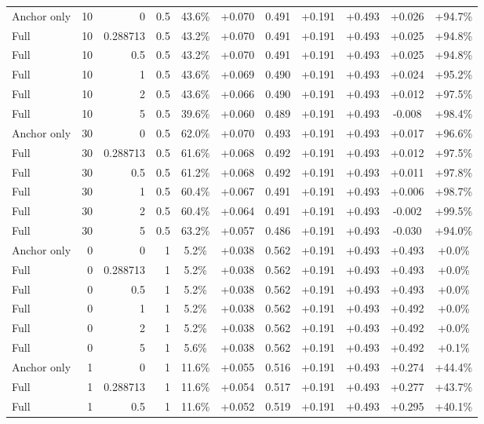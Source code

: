 \begin{table}[htbp]
\begin{tabular}{lrrrccccccc}
Anchor only & 10 & 0 & 0.5 & 43.6\% & +0.070 & 0.491 & +0.191 & +0.493 & +0.026 & +94.7\% \\
Full & 10 & 0.288713 & 0.5 & 43.2\% & +0.070 & 0.491 & +0.191 & +0.493 & +0.025 & +94.8\% \\
Full & 10 & 0.5 & 0.5 & 43.2\% & +0.070 & 0.491 & +0.191 & +0.493 & +0.025 & +94.8\% \\
Full & 10 & 1 & 0.5 & 43.6\% & +0.069 & 0.490 & +0.191 & +0.493 & +0.024 & +95.2\% \\
Full & 10 & 2 & 0.5 & 43.6\% & +0.066 & 0.490 & +0.191 & +0.493 & +0.012 & +97.5\% \\
Full & 10 & 5 & 0.5 & 39.6\% & +0.060 & 0.489 & +0.191 & +0.493 & -0.008 & +98.4\% \\
Anchor only & 30 & 0 & 0.5 & 62.0\% & +0.070 & 0.493 & +0.191 & +0.493 & +0.017 & +96.6\% \\
Full & 30 & 0.288713 & 0.5 & 61.6\% & +0.068 & 0.492 & +0.191 & +0.493 & +0.012 & +97.5\% \\
Full & 30 & 0.5 & 0.5 & 61.2\% & +0.068 & 0.492 & +0.191 & +0.493 & +0.011 & +97.8\% \\
Full & 30 & 1 & 0.5 & 60.4\% & +0.067 & 0.491 & +0.191 & +0.493 & +0.006 & +98.7\% \\
Full & 30 & 2 & 0.5 & 60.4\% & +0.064 & 0.491 & +0.191 & +0.493 & -0.002 & +99.5\% \\
Full & 30 & 5 & 0.5 & 63.2\% & +0.057 & 0.486 & +0.191 & +0.493 & -0.030 & +94.0\% \\
Anchor only & 0 & 0 & 1 & 5.2\% & +0.038 & 0.562 & +0.191 & +0.493 & +0.493 & +0.0\% \\
Full & 0 & 0.288713 & 1 & 5.2\% & +0.038 & 0.562 & +0.191 & +0.493 & +0.493 & +0.0\% \\
Full & 0 & 0.5 & 1 & 5.2\% & +0.038 & 0.562 & +0.191 & +0.493 & +0.493 & +0.0\% \\
Full & 0 & 1 & 1 & 5.2\% & +0.038 & 0.562 & +0.191 & +0.493 & +0.492 & +0.0\% \\
Full & 0 & 2 & 1 & 5.2\% & +0.038 & 0.562 & +0.191 & +0.493 & +0.492 & +0.0\% \\
Full & 0 & 5 & 1 & 5.6\% & +0.038 & 0.562 & +0.191 & +0.493 & +0.492 & +0.1\% \\
Anchor only & 1 & 0 & 1 & 11.6\% & +0.055 & 0.516 & +0.191 & +0.493 & +0.274 & +44.4\% \\
Full & 1 & 0.288713 & 1 & 11.6\% & +0.054 & 0.517 & +0.191 & +0.493 & +0.277 & +43.7\% \\
Full & 1 & 0.5 & 1 & 11.6\% & +0.052 & 0.519 & +0.191 & +0.493 & +0.295 & +40.1\% \\

\end{tabular}
\end{table}
